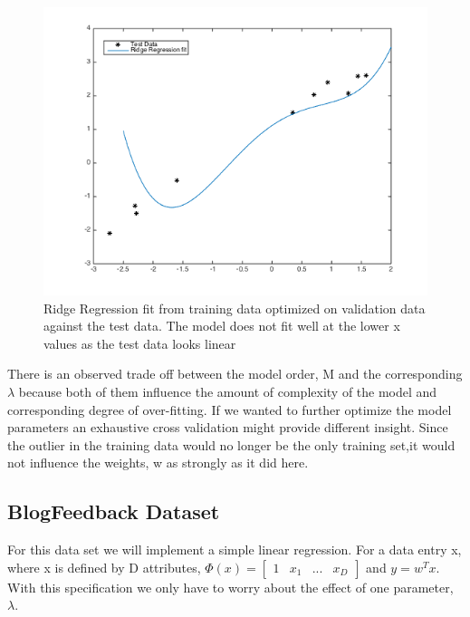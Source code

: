 \documentclass[10pt,twocolumn]{article}
\begin{document}
\begin{figure}
\center
\includegraphics[scale =.45]{testplot.png}
\caption{Ridge Regression fit from training data optimized on validation data against the test data. The model does not fit well at the lower x values as the test data looks linear }
\end{figure}

 There is an observed trade off between the model order, M and the corresponding $\lambda$ because both of them influence the amount of  complexity of the model and corresponding  degree of over-fitting.  If we wanted to further optimize the model parameters an exhaustive cross validation might provide different insight.  Since the outlier in the training data would no longer be the only training set,it would not influence the weights, w as strongly as it did here.  

\subsection*{ BlogFeedback Dataset}
For this data set we will implement a simple linear regression. For a data entry x, where x is defined by D attributes, $\Phi(x)= \begin{bmatrix} 1 &  x_1 & ... & x_D \end{bmatrix}$ and $y = w^T x$. With this specification we only have to worry about the effect of one parameter, $\lambda$. 
\end{document}
